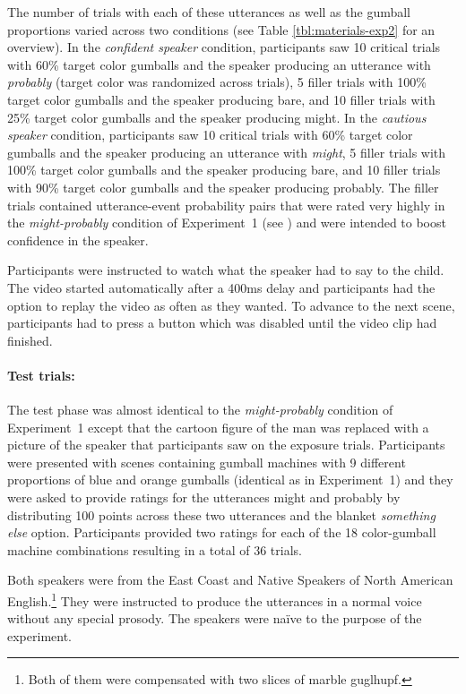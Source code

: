 The number of trials with each of these utterances as well as the gumball proportions varied across two conditions (see Table \ref{tbl:materials-exp2} for an overview). In the {\it confident speaker} condition, participants saw 10 critical trials with 60\% target color gumballs and the speaker producing an utterance with \emph{probably} (target color was randomized across trials), 5 filler trials with 100\% target color gumballs and the speaker producing {\sc bare}, and 10 filler trials with 25\% target color gumballs and the speaker producing {\sc might}. In the {\it cautious speaker} condition, participants saw 10 critical trials with 60\% target color gumballs and the speaker producing an utterance with \emph{might}, 5 filler trials with 100\% target color gumballs and the speaker producing {\sc bare}, and 10 filler trials with 90\% target color gumballs and the speaker producing {\sc probably}. The filler trials contained utterance-event probability pairs that were rated very highly in the \textit{might-probably} condition of Experiment~1 (see ) and were intended to boost confidence in the speaker.

Participants were instructed to watch what the speaker had to say to the child. The video started automatically after a 400ms delay and participants had the option to replay the video as often as they wanted. To advance to the next scene, participants had to press a button which was disabled until the video clip had finished.

\paragraph{Test trials:} The test phase was almost identical to the  \textit{might-probably} condition of Experiment~1 except that the cartoon figure of the man was replaced with a picture of the speaker that participants saw on the exposure trials. Participants were presented with scenes containing gumball machines with 9 different proportions of blue and orange gumballs  (identical as in Experiment~1) and they were asked to provide ratings for the utterances {\sc might} and {\sc probably} by distributing 100 points across these two utterances and the blanket {\it something else} option. Participants provided two ratings for each of the 18 color-gumball machine combinations resulting in a total of 36 trials. 

Both speakers were from the East Coast and Native Speakers of North American English.\footnote{Both of them were compensated with two slices of marble guglhupf.}
They were instructed to produce the utterances in a normal voice without any special prosody. The speakers were
na\"ive to the purpose of the experiment.


